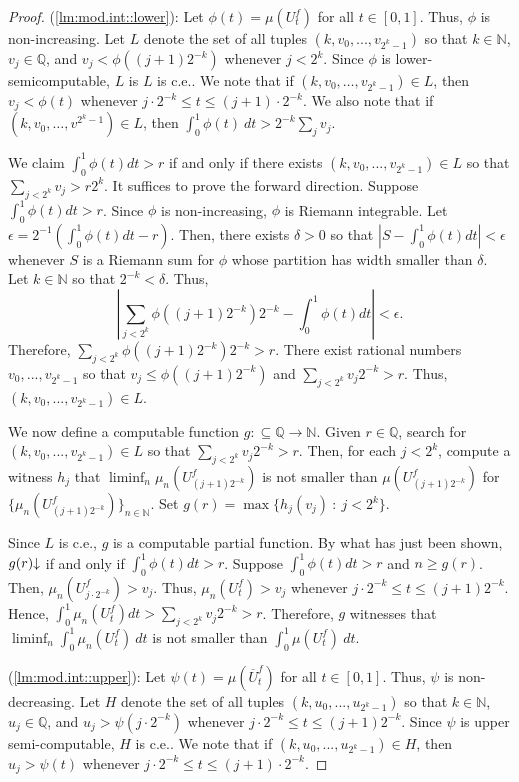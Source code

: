 \documentclass{amsart}
\newcommand{\Q}{\mathbb{Q}}
\newcommand{\N}{\mathbb{N}}
\newcommand{\halts}{\hspace{-0.1cm}\downarrow}
\newcommand{\ol}{\overline}
\theoremstyle{definition}
\numberwithin{equation}{section}
\begin{document}
\begin{proof}
(\ref{lm:mod.int::lower}): Let $\phi(t)=\mu(U^f_t)$ for all $t\in[0,1]$.  Thus, $\phi$ is non-increasing.  
Let $L$ denote the set of all tuples $(k,v_0,...,v_{2^k-1})$ so that $k\in\N$, $v_j\in\Q$, and $v_j<\phi((j+1)2^{-k})$ whenever $j < 2^k$.  Since $\phi$ is lower-semicomputable, $L$ is $L$ is c.e..  We note that if $(k, v_0, \ldots, v_{2^k - 1}) \in L$, then 
$v_j < \phi(t)$ whenever $j\cdot2^{-k} \leq t \leq (j+1)\cdot2^{-k}$.  We also note that if $(k, v_0, \ldots, v^{2^k - 1}) \in L$, then $\int_0^1 \phi(t)\ dt > 2^{-k} \sum_j v_j$.

We claim $\int_0^1\phi(t)dt>r$ if and only if there exists $(k,v_0,...,v_{2^k-1})\in L$ so that $\sum_{j<2^k}v_j>r2^k$. 
It suffices to prove the forward direction. 
Suppose $\int_0^1\phi(t)dt>r$. 
Since $\phi$ is non-increasing, $\phi$ is Riemann integrable. 
Let $\epsilon=2^{-1}\left(\int_0^1\phi(t)dt -r\right)$. 
Then, there exists $\delta>0$ so that $\left|S-\int_0^1\phi(t)dt\right|<\epsilon$ whenever $S$ is a Riemann sum for $\phi$ whose partition has width smaller than $\delta$. 
Let $k \in \N$ so that $2^{-k}<\delta$. 
Thus, 
\[
\left|\sum_{j<2^k} \phi((j+1)2^{-k}) 2^{-k} - \int_0^1\phi(t)dt\right|<\epsilon.
\]
Therefore, $\sum_{j<2^k} \phi((j+1)2^{-k}) 2^{-k}>r$. 
There exist rational numbers $v_0,...,v_{2^k-1}$ so that $v_j\leq \phi((j+1)2^{-k})$ and $\sum_{j<2^k} v_j 2^{-k}>r$. 
Thus, $(k,v_0,...,v_{2^k-1})\in L$. 

We now define a computable function $g : \subseteq \Q \rightarrow \N$.   
Given $r\in\Q$, search for $(k,v_0,...,v_{2^k-1}) \in L$ so that $\sum_{j<2^k} v_j 2^{-k}>r$. 
Then, for each $j < 2^k$, compute a witness $h_j$ that $\liminf_n \mu_n(U^f_{(j+1)2^{-k}})$ is not smaller than $\mu(U^f_{(j+1)2^{-k}})$ for $\{\mu_n(U^f_{(j+1)2^{-k}})\}_{n \in \N}$.
Set $g(r) = \max\{h_j(v_j)\ :\ j < 2^k\}$.  

Since $L$ is c.e., $g$ is a computable partial function. 
By what has just been shown, $g(r)\halts$ if and only if $\int_0^1\phi(t)dt>r$. 
Suppose $\int_0^1\phi(t)dt > r$ and $n\geq g(r)$. 
Then, $\mu_n(U^f_{j\cdot2^{-k}})>v_j$. 
Thus, $\mu_n(U^f_t)>v_j$ whenever $j \cdot 2^{-k} \leq t \leq (j+1)2^{-k}$. 
Hence, $\int_0^1\mu_n(U^f_t)dt > \sum_{j<2^k} v_j2^{-k} > r$.  
Therefore, $g$ witnesses that $\liminf_n \int_0^1 \mu_n(U^f_t)\ dt$ is not smaller than $\int_0^1 \mu(U^f_t)\ dt$.

(\ref{lm:mod.int::upper}):
 Let $\psi(t)=\mu(\ol{U}^f_t)$ for all $t\in[0,1]$.  Thus, $\psi$ is non-decreasing.
Let $H$ denote the set of all tuples $(k,u_0,...,u_{2^k-1})$ so that $k\in\N$, $u_j\in\Q$, and $u_j>\psi(j\cdot2^{-k})$ whenever $j\cdot2^{-k}\leq t\leq(j+1)2^{-k}$.  
Since $\psi$ is upper semi-computable, $H$ is c.e..  We note that if $(k,u_0,...,u_{2^k-1})\in H$, then 
$u_j > \psi(t)$ whenever $j\cdot 2^{-k} \leq t \leq (j+1) \cdot 2^{-k}$.  


\end{proof}
\end{document}
